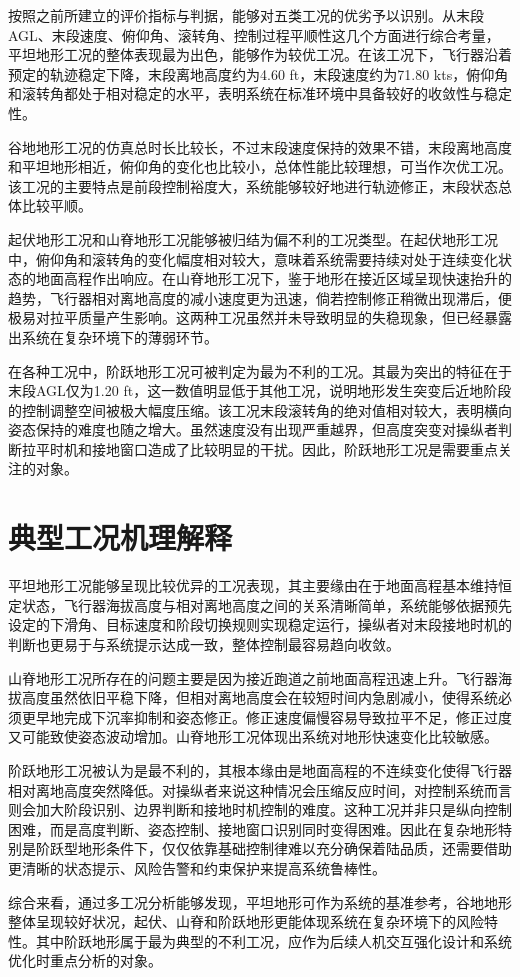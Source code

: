 按照之前所建立的评价指标与判据，能够对五类工况的优劣予以识别。从末段AGL、末段速度、俯仰角、滚转角、控制过程平顺性这几个方面进行综合考量，平坦地形工况的整体表现最为出色，能够作为较优工况。在该工况下，飞行器沿着预定的轨迹稳定下降，末段离地高度约为4.60 ft，末段速度约为71.80 kts，俯仰角和滚转角都处于相对稳定的水平，表明系统在标准环境中具备较好的收敛性与稳定性。

谷地地形工况的仿真总时长比较长，不过末段速度保持的效果不错，末段离地高度和平坦地形相近，俯仰角的变化也比较小，总体性能比较理想，可当作次优工况。该工况的主要特点是前段控制裕度大，系统能够较好地进行轨迹修正，末段状态总体比较平顺。

起伏地形工况和山脊地形工况能够被归结为偏不利的工况类型。在起伏地形工况中，俯仰角和滚转角的变化幅度相对较大，意味着系统需要持续对处于连续变化状态的地面高程作出响应。在山脊地形工况下，鉴于地形在接近区域呈现快速抬升的趋势，飞行器相对离地高度的减小速度更为迅速，倘若控制修正稍微出现滞后，便极易对拉平质量产生影响。这两种工况虽然并未导致明显的失稳现象，但已经暴露出系统在复杂环境下的薄弱环节。

在各种工况中，阶跃地形工况可被判定为最为不利的工况。其最为突出的特征在于末段AGL仅为1.20 ft，这一数值明显低于其他工况，说明地形发生突变后近地阶段的控制调整空间被极大幅度压缩。该工况末段滚转角的绝对值相对较大，表明横向姿态保持的难度也随之增大。虽然速度没有出现严重越界，但高度突变对操纵者判断拉平时机和接地窗口造成了比较明显的干扰。因此，阶跃地形工况是需要重点关注的对象。

\section{典型工况机理解释}

平坦地形工况能够呈现比较优异的工况表现，其主要缘由在于地面高程基本维持恒定状态，飞行器海拔高度与相对离地高度之间的关系清晰简单，系统能够依据预先设定的下滑角、目标速度和阶段切换规则实现稳定运行，操纵者对末段接地时机的判断也更易于与系统提示达成一致，整体控制最容易趋向收敛。

山脊地形工况所存在的问题主要是因为接近跑道之前地面高程迅速上升。飞行器海拔高度虽然依旧平稳下降，但相对离地高度会在较短时间内急剧减小，使得系统必须更早地完成下沉率抑制和姿态修正。修正速度偏慢容易导致拉平不足，修正过度又可能致使姿态波动增加。山脊地形工况体现出系统对地形快速变化比较敏感。

阶跃地形工况被认为是最不利的，其根本缘由是地面高程的不连续变化使得飞行器相对离地高度突然降低。对操纵者来说这种情况会压缩反应时间，对控制系统而言则会加大阶段识别、边界判断和接地时机控制的难度。这种工况并非只是纵向控制困难，而是高度判断、姿态控制、接地窗口识别同时变得困难。因此在复杂地形特别是阶跃型地形条件下，仅仅依靠基础控制律难以充分确保着陆品质，还需要借助更清晰的状态提示、风险告警和约束保护来提高系统鲁棒性。

综合来看，通过多工况分析能够发现，平坦地形可作为系统的基准参考，谷地地形整体呈现较好状况，起伏、山脊和阶跃地形更能体现系统在复杂环境下的风险特性。其中阶跃地形属于最为典型的不利工况，应作为后续人机交互强化设计和系统优化时重点分析的对象。
